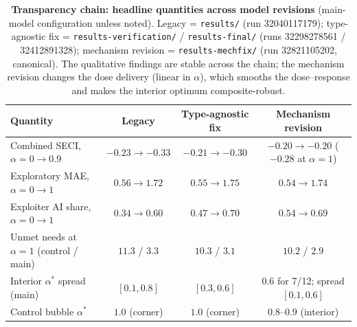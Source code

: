 \documentclass[11pt]{article}
\begin{document}
\begin{table}[h!]
\centering
\caption{\textbf{Transparency chain: headline quantities across model
revisions} (main-model configuration unless noted). Legacy =
\texttt{results/} (run 32040117179); type-agnostic fix =
\texttt{results-verification/} / \texttt{results-final/} (runs
32298278561 / 32412891328); mechanism revision =
\texttt{results-mechfix/} (run 32821105202, canonical). The qualitative
findings are stable across the chain; the mechanism revision changes the
dose delivery (linear in $\alpha$), which smooths the dose--response and
makes the interior optimum composite-robust.}\label{tab:s5-chain}
\small
\begin{tabular}{@{}lccc@{}}
\toprule
Quantity & Legacy & Type-agnostic fix & Mechanism revision \\
\midrule
Combined SECI, $\alpha{=}0 \to 0.9$ & $-0.23 \to -0.33$ & $-0.21 \to -0.30$ & $-0.20 \to -0.20$ ($-0.28$ at $\alpha{=}1$) \\
Exploratory MAE, $\alpha{=}0 \to 1$ & $0.56 \to 1.72$ & $0.55 \to 1.75$ & $0.54 \to 1.74$ \\
Exploiter AI share, $\alpha{=}0 \to 1$ & $0.34 \to 0.60$ & $0.47 \to 0.70$ & $0.54 \to 0.69$ \\
Unmet needs at $\alpha{=}1$ (control / main) & $11.3$ / $3.3$ & $10.3$ / $3.1$ & $10.2$ / $2.9$ \\
Interior $\alpha^{*}$ spread (main) & $[0.1, 0.8]$ & $[0.3, 0.6]$ & $0.6$ for 7/12; spread $[0.1, 0.6]$ \\
Control bubble $\alpha^{*}$ & $1.0$ (corner) & $1.0$ (corner) & $0.8$--$0.9$ (interior) \\
\bottomrule
\end{tabular}
\end{table}
\end{document}
